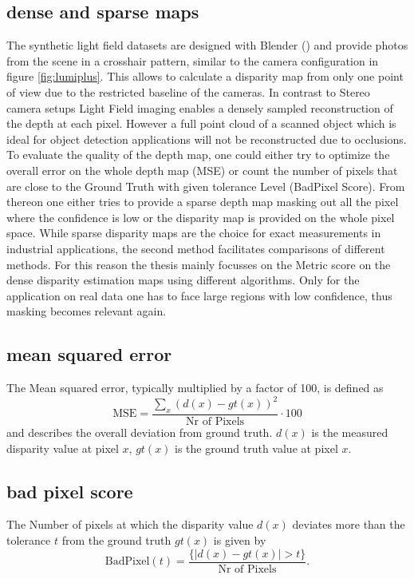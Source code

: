 \documentclass  [
  paper    = a4,
  BCOR     = 10mm,
  twoside,
  fontsize = 12pt,
  fleqn,
  toc      = bibnumbered,
  toc      = listofnumbered,
  numbers  = noendperiod,
  headings = normal,
  listof   = leveldown,
  version  = 3.03
]                                       {scrreprt}
\begin{document}
\subsection{dense and sparse maps}
The synthetic light field datasets are designed with Blender (\cite{blender2014blender}) and provide photos from the scene in a crosshair pattern, similar to the camera configuration in figure \ref{fig:lumiplus}. This allows to calculate a disparity map from only one point of view due to the restricted baseline of the cameras. In contrast to Stereo camera setups Light Field imaging enables a densely sampled reconstruction of the depth at each pixel. However a full point cloud of a scanned object  which is ideal for object detection applications will not be reconstructed due to occlusions. To evaluate the quality of the depth map, one could either try to optimize the overall error on the whole depth map (MSE) or count the number of pixels that are close to the Ground Truth with given tolerance Level (BadPixel Score). From thereon one either tries to provide a sparse depth map masking out all the pixel where the confidence is low or the disparity map is provided on the whole pixel space. While sparse disparity maps are the choice for exact measurements in industrial applications, the second method facilitates comparisons of different methods. For this reason the thesis mainly focusses on the Metric score on the dense disparity estimation maps using different algorithms. Only for the application on real data one has to face large regions with low confidence, thus masking becomes relevant again.
\subsection{mean squared error}
The Mean squared error, typically multiplied by a factor of 100, is defined as 
\begin{equation}\label{key}
\text{MSE} = \frac{\sum_x (d(x) - gt(x))^2}{\text{Nr of Pixels}} \cdot 100
\end{equation}
and describes the overall deviation from ground truth. $d(x)$ is the measured disparity value at pixel $x$, $gt(x)$ is the ground truth value at pixel $x$. 
\subsection{bad pixel score}
The Number of pixels at which the disparity value $d(x)$ deviates more than the tolerance $t$ from the ground truth $gt(x)$ is given by
\begin{equation}\label{key}
\text{BadPixel}(t) = \frac{\{|d(x) - gt(x)| > t \}}{\text{Nr of Pixels}}.
\end{equation}
\end{document}
